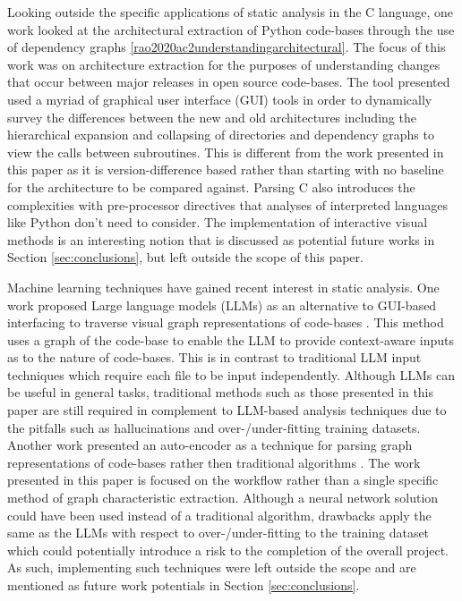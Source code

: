 Looking outside the specific applications of static analysis in the C language, one work looked at the architectural extraction of Python code-bases through the use of dependency graphs \ref{rao2020ac2understandingarchitectural}. The focus of this work was on architecture extraction for the purposes of understanding changes that occur between major releases in open source code-bases. The tool presented used a myriad of graphical user interface (GUI) tools in order to dynamically survey the differences between the new and old architectures including the hierarchical expansion and collapsing of directories and dependency graphs to view the calls between subroutines. This is different from the work presented in this paper as it is version-difference based rather than starting with no baseline for the architecture to be compared against. Parsing C also introduces the complexities with pre-processor directives that analyses of interpreted languages like Python don't need to consider. The implementation of interactive visual methods is an interesting notion that is discussed as potential future works in Section \ref{sec:conclusions}, but left outside the scope of this paper.

Machine learning techniques have gained recent interest in static analysis. One work proposed Large language models (LLMs) as an alternative to GUI-based interfacing to traverse visual graph representations of code-bases \cite{liu2024codexgraphbridginglargelanguage}. This method uses a graph of the code-base to enable the LLM to provide context-aware inputs as to the nature of code-bases. This is in contrast to traditional LLM input techniques which require each file to be input independently. Although LLMs can be useful in general tasks, traditional methods such as those presented in this paper are still required in complement to LLM-based analysis techniques due to the pitfalls such as hallucinations and over-/under-fitting training datasets. Another work presented an auto-encoder as a technique for parsing graph representations of code-bases rather then traditional algorithms \cite{8711909}. The work presented in this paper is focused on the workflow rather than a single specific method of graph characteristic extraction. Although a neural network solution could have been used instead of a traditional algorithm, drawbacks apply the same as the LLMs with respect to over-/under-fitting to the training dataset which could potentially introduce a risk to the completion of the overall project. As such, implementing such techniques were left outside the scope and are mentioned as future work potentials in Section \ref{sec:conclusions}.



